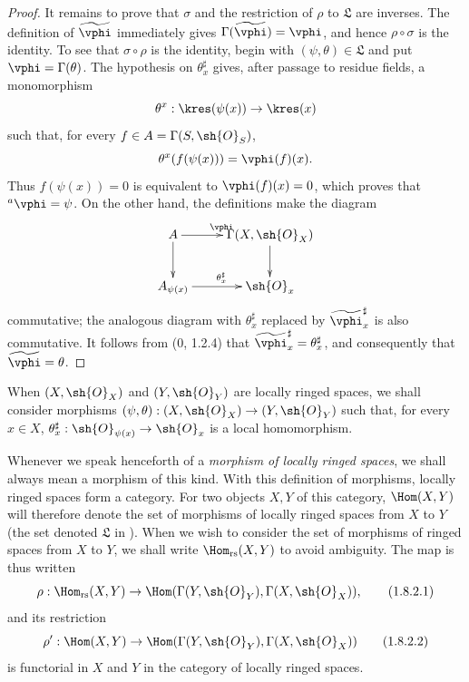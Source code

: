 \begin{proof}
It remains to prove that $\sigma$ and the restriction of $\rho$ to
$\mathfrak{L}$ are inverses.  The definition of
$\widetilde{\vphi}$ immediately gives
$\Gamma(\widetilde{\vphi})=\vphi$, and hence
$\rho\circ\sigma$ is the identity.  To see that $\sigma\circ\rho$ is
the identity, begin with $(\psi,\theta)\in\mathfrak{L}$ and put
$\vphi=\Gamma(\theta)$.  The hypothesis on $\theta_x^\sharp$ gives,
after passage to residue fields, a monomorphism
\[
  \theta^x:\kres(\psi(x))\to\kres(x)
\]
such that, for every $f\in A=\Gamma(S,\sh{O}_S)$,
\[
  \theta^x(f(\psi(x)))=\vphi(f)(x).
\]
Thus $f(\psi(x))=0$ is equivalent to $\vphi(f)(x)=0$, which proves
that ${}^a\vphi=\psi$.  On the other hand, the definitions make the
diagram
\[
  \xymatrix{
    A\ar[r]^\vphi\ar[d] &
    \Gamma(X,\sh{O}_X)\ar[d]\\
    A_{\psi(x)}\ar[r]^{\theta_x^\sharp} &
    \sh{O}_x
  }
\]
commutative; the analogous diagram with $\theta_x^\sharp$ replaced
by $\widetilde{\vphi}_x^\sharp$ is also commutative.  It follows from
(0, 1.2.4) that
$\widetilde{\vphi}_x^\sharp=\theta_x^\sharp$, and consequently that
$\widetilde{\vphi}=\theta$.
\end{proof}

\begin{env}[1.8.2]
\label{I.1.8.2}
When $(X,\sh{O}_X)$ and $(Y,\sh{O}_Y)$ are locally ringed spaces, we
shall consider morphisms
$(\psi,\theta):(X,\sh{O}_X)\to(Y,\sh{O}_Y)$ such that, for every
$x\in X$, $\theta_x^\sharp:\sh{O}_{\psi(x)}\to\sh{O}_x$ is a local
homomorphism.

Whenever we speak henceforth of a \emph{morphism of locally ringed
spaces}, we shall always mean a morphism of this kind.  With this
definition of morphisms, locally ringed spaces form a category.  For
two objects $X,Y$ of this category, $\Hom(X,Y)$ will therefore denote
the set of morphisms of locally ringed spaces from $X$ to $Y$ (the set
denoted $\mathfrak{L}$ in ).  When we wish to consider
the set of morphisms of ringed spaces from $X$ to $Y$, we shall write
$\Hom_{\mathrm{rs}}(X,Y)$ to avoid ambiguity.  The map
 is thus written
\begin{equation}
\label{I.1.8.2.1}
  \rho:\Hom_{\mathrm{rs}}(X,Y)
  \to\Hom(\Gamma(Y,\sh{O}_Y),\Gamma(X,\sh{O}_X)),
\tag{1.8.2.1}
\end{equation}
and its restriction
\begin{equation}
\label{I.1.8.2.2}
  \rho':\Hom(X,Y)
  \to\Hom(\Gamma(Y,\sh{O}_Y),\Gamma(X,\sh{O}_X))
\tag{1.8.2.2}
\end{equation}
is functorial in $X$ and $Y$ in the category of locally ringed spaces.
\end{env}

